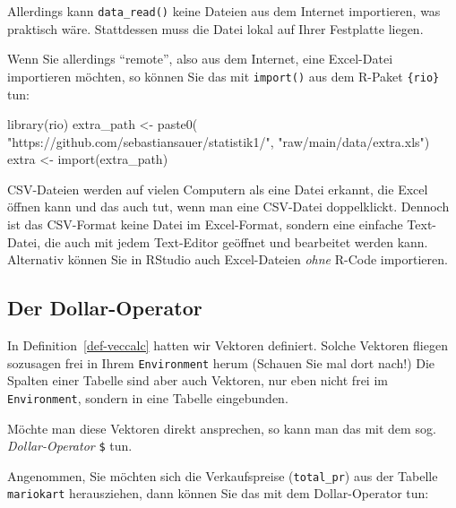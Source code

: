 \documentclass[
  letterpaper,
]{scrbook}
\newenvironment{Shaded}{\begin{snugshade}}{\end{snugshade}}
\newcommand{\DocumentationTok}[1]{\textcolor[rgb]{0.37,0.37,0.37}{\textit{#1}}}
\newcommand{\FunctionTok}[1]{\textcolor[rgb]{0.28,0.35,0.67}{#1}}
\newcommand{\NormalTok}[1]{\textcolor[rgb]{0.00,0.23,0.31}{#1}}
\newcommand{\OtherTok}[1]{\textcolor[rgb]{0.00,0.23,0.31}{#1}}
\newcommand{\SpecialCharTok}[1]{\textcolor[rgb]{0.37,0.37,0.37}{#1}}
\newcommand{\StringTok}[1]{\textcolor[rgb]{0.13,0.47,0.30}{#1}}
\theoremstyle{definition}
\theoremstyle{definition}
\theoremstyle{definition}
\theoremstyle{remark}
\begin{document}
Allerdings kann \texttt{data\_read()} keine Dateien aus dem Internet
importieren, was praktisch wäre. Stattdessen muss die Datei lokal auf
Ihrer Festplatte liegen.

Wenn Sie allerdings \enquote{remote}, also aus dem Internet, eine
Excel-Datei importieren möchten, so können Sie das mit \texttt{import()}
aus dem R-Paket \texttt{\{rio\}} tun:

\begin{Shaded}
\begin{Highlighting}[]
\FunctionTok{library}\NormalTok{(rio)}
\NormalTok{extra\_path }\OtherTok{\textless{}{-}} \FunctionTok{paste0}\NormalTok{(}
  \StringTok{"https://github.com/sebastiansauer/statistik1/"}\NormalTok{,}
  \StringTok{"raw/main/data/extra.xls"}\NormalTok{)}
\NormalTok{extra }\OtherTok{\textless{}{-}} \FunctionTok{import}\NormalTok{(extra\_path)}
\end{Highlighting}
\end{Shaded}

CSV-Dateien werden auf vielen Computern als eine Datei erkannt, die
Excel öffnen kann und das auch tut, wenn man eine CSV-Datei
doppelklickt. Dennoch ist das CSV-Format keine Datei im Excel-Format,
sondern eine einfache Text-Datei, die auch mit jedem Text-Editor
geöffnet und bearbeitet werden kann. Alternativ können Sie in RStudio
auch Excel-Dateien \emph{ohne} R-Code importieren.

\subsection{Der Dollar-Operator}\label{sec-dollar-op}

In Definition~\ref{def-veccalc} hatten wir Vektoren definiert. Solche
Vektoren fliegen sozusagen frei in Ihrem \texttt{Environment} herum
(Schauen Sie mal dort nach!) Die Spalten einer Tabelle sind aber auch
Vektoren, nur eben nicht frei im \texttt{Environment}, sondern in eine
Tabelle eingebunden.

Möchte man diese Vektoren direkt ansprechen, so kann man das mit dem
sog. \emph{Dollar-Operator} \texttt{\$} tun.

Angenommen, Sie möchten sich die Verkaufspreise (\texttt{total\_pr}) aus
der Tabelle \texttt{mariokart} herausziehen, dann können Sie das mit dem
Dollar-Operator tun:

\begin{Shaded}
\end{Shaded}
\end{document}
